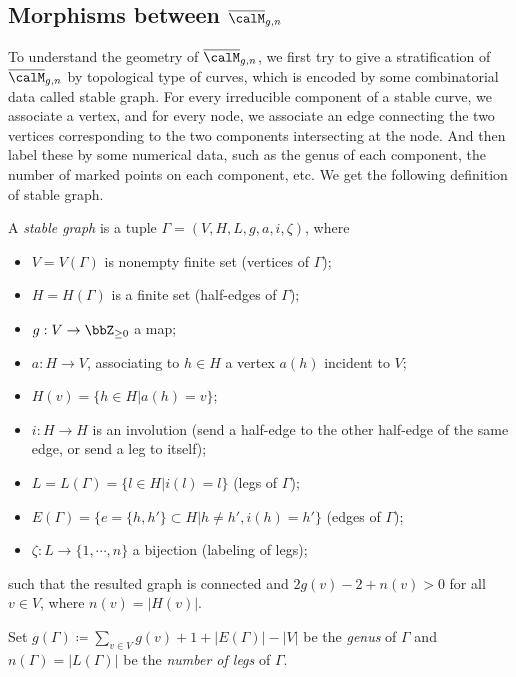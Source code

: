 \subsection[Morphism between moduli of stable curves]{Morphisms between $\overline{\calM}_{g,n}$}

  To understand the geometry of $\overline{\calM}_{g,n}$, we first try to give a stratification of $\overline{\calM}_{g,n}$ by topological type of curves, which is encoded by some combinatorial data called stable graph.
  For every irreducible component of a stable curve, we associate a vertex, and for every node, we associate an edge connecting the two vertices corresponding to the two components intersecting at the node.
  And then label these by some numerical data, such as the genus of each component, the number of marked points on each component, etc.
  We get the following definition of stable graph.

  \begin{definition}
    A \emph{stable graph} is a tuple $\Gamma = (V,H,L,g,a,i,\zeta)$, where
    \begin{itemize}
      \item $V=V(\Gamma)$ is nonempty finite set (vertices of $\Gamma$);
      \item $H= H (\Gamma)$ is a finite set (half-edges of $\Gamma$);
      \item $g: V \to \bbZ_{\geq 0}$ a map;
      \item $a:H \to V$, associating to $h \in H$ a vertex $a(h)$ incident to $V$; 
      \item $H(v) = \{h \in H| a(h) = v\}$;
      \item $i:H \to H$ is an involution (send a half-edge to the other half-edge of the same edge, or send a leg to itself);
      \item $L = L(\Gamma) = \{l \in H | i(l) = l\}$ (legs of $\Gamma$);
      \item $E(\Gamma) = \{e = \{h,h'\} \subset H | h\neq h', i(h) = h'\}$ (edges of $\Gamma$);
      \item $\zeta: L \to \{1,\cdots,n\}$ a bijection (labeling of legs);
    \end{itemize}
    such that the resulted graph is connected and $2g(v) - 2 + n(v) > 0$ for all $v \in V$, where $n(v) = |H(v)|$.

    Set $g(\Gamma) \coloneqq \sum_{v \in V} g(v) + 1 + |E(\Gamma)| - |V|$ be the \emph{genus} of $\Gamma$ and $n(\Gamma) = |L(\Gamma)|$ be the \emph{number of legs} of $\Gamma$.
  \end{definition}

